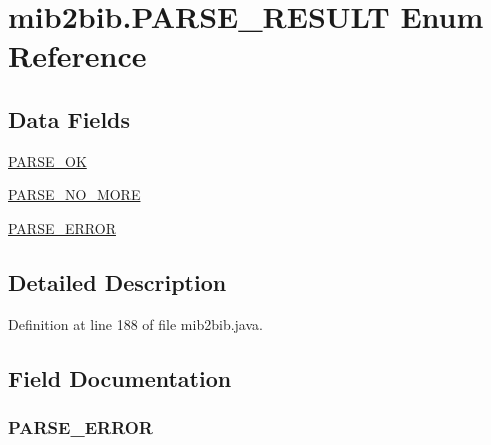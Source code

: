 \hypertarget{enummib2bib_1_1mib2bib_1_1_p_a_r_s_e___r_e_s_u_l_t}{}\section{mib2bib.\+P\+A\+R\+S\+E\+\_\+\+R\+E\+S\+U\+L\+T Enum Reference}
\label{enummib2bib_1_1mib2bib_1_1_p_a_r_s_e___r_e_s_u_l_t}
\subsection*{Data Fields}
\begin{DoxyCompactItemize}
\item 
\hyperlink{enummib2bib_1_1mib2bib_1_1_p_a_r_s_e___r_e_s_u_l_t_a4e1f9dd93892440676c62b60e0714d1f}{P\+A\+R\+S\+E\+\_\+\+O\+K}
\item 
\hyperlink{enummib2bib_1_1mib2bib_1_1_p_a_r_s_e___r_e_s_u_l_t_a49d5c0305e66bf653c6110e2add14238}{P\+A\+R\+S\+E\+\_\+\+N\+O\+\_\+\+M\+O\+R\+E}
\item 
\hyperlink{enummib2bib_1_1mib2bib_1_1_p_a_r_s_e___r_e_s_u_l_t_a94fa6733f9340643553e8c29c4f824ff}{P\+A\+R\+S\+E\+\_\+\+E\+R\+R\+O\+R}
\end{DoxyCompactItemize}


\subsection{Detailed Description}


Definition at line 188 of file mib2bib.\+java.



\subsection{Field Documentation}
\hypertarget{enummib2bib_1_1mib2bib_1_1_p_a_r_s_e___r_e_s_u_l_t_a94fa6733f9340643553e8c29c4f824ff}{}
\subsubsection[{P\+A\+R\+S\+E\+\_\+\+E\+R\+R\+O\+R}]{\setlength{\rightskip}{0pt plus 5cm}P\+A\+R\+S\+E\+\_\+\+E\+R\+R\+O\+R}\label{enummib2bib_1_1mib2bib_1_1_p_a_r_s_e___r_e_s_u_l_t_a94fa6733f9340643553e8c29c4f824ff}


